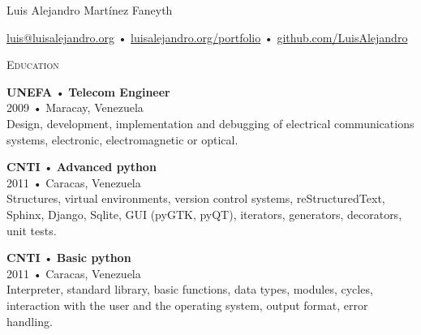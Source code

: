 \documentclass[12pt]{article}
\begin{document}
\centering
\begin{cv}{Luis Alejandro Mart\'inez Faneyth}
  
  \vspace{0.25em}
  \href{mailto:luis@luisalejandro.org}{luis@luisalejandro.org} •
  \href{https://luisalejandro.org/portfolio}{luisalejandro.org/portfolio} •
  \href{https://github.com/LuisAlejandro}{github.com/LuisAlejandro}
  \vspace{0.125em}

  \hrulefill

  \begin{minipage}[t]{0.35\textwidth}
    \vspace{0.125em}
    
    \begin{minipage}{\linewidth}
      \textrm{\textsc{\Large{Education}}}
      \newline
      \parbox[t]{\linewidth}{
        \textbf{UNEFA} • \textrm{\textbf{Telecom Engineer}}\\
        2009 • Maracay, Venezuela\\
        \footnotesize{Design, development, implementation and debugging of electrical communications systems, electronic, electromagnetic or optical.}\\
      }
      \newline
      \parbox[t]{\linewidth}{
        \textbf{CNTI} • \textrm{\textbf{Advanced python}}\\
        2011 • Caracas, Venezuela\\
        \footnotesize{Structures, virtual environments, version control systems, reStructuredText, Sphinx, Django, Sqlite, GUI (pyGTK, pyQT), iterators, generators, decorators, unit tests.}\\
      }
      \newline
      \parbox[t]{\linewidth}{
        \textbf{CNTI} • \textrm{\textbf{Basic python}}\\
        2011 • Caracas, Venezuela\\
        \footnotesize{Interpreter, standard library, basic functions, data types, modules, cycles, interaction with the user and the operating system, output format, error handling.}\\
      }
      \newline
    \end{minipage}


\end{minipage}
\end{cv}
\end{document}
